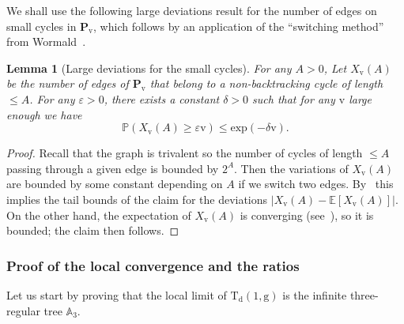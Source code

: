 \documentclass[11pt]{article}
\theoremstyle{plain}
\newtheorem{lemma}[theorem]{Lemma}
\theoremstyle{definition}
\theoremstyle{remark}
\renewcommand{\P}{\mathbb{P}}
\newcommand{\E}{\mathbb{E}}
\newcommand{\Triv}{\mathrm{T}}
\newcommand{\defect}{\mathrm{d}}
\newcommand{\gen}{\mathrm{g}}
\newcommand{\ver}{\mathrm{v}}
\begin{document}
We shall use the following large deviations result for the number of edges on small cycles in $\mathbf{P}_{\ver}$, which follows by an application of the ``switching method'' from Wormald~\cite[Th.\,2.19]{Wor99}.

\begin{lemma}[Large deviations for the small cycles]
\label{lem:grandes_dev_cycles_config}
For any $A>0$, Let $X_{ \ver}(A)$ be the number of edges of $\mathbf{P}_{\ver}$ that belong to a non-backtracking cycle of length $\leq A$. For any $ \varepsilon>0$, there exists a constant $ \delta >0$ such that for any $\ver$ large enough we have
\[
\P(X_{ \ver}(A) \geq \varepsilon \ver) \leq \mathrm{exp}(- \delta \ver).
\]
\end{lemma}

\begin{proof}
Recall that the graph is trivalent so the number of cycles of length $\leq A$ passing through a given edge is bounded by $2^A$. Then the variations of $ X_{ \ver}(A)$ are bounded by some constant depending on $A$ if we switch two edges. By~\cite[Th.\,2.19]{Wor99} this implies the tail bounds of the claim for the deviations $|X_{ \ver}(A) - \E[X_{ \ver}(A)]|$. On the other hand, the expectation of $X_{ \ver}(A)$ is converging (see~\cite[Eq.\,(8) in \S2.3]{Wor99}), so it is bounded; the claim then follows.
\end{proof}

\subsubsection{Proof of the local convergence and the ratios}

Let us start by proving that the local limit of $ \Triv_{\defect}(1, \gen)$ is the infinite three-regular tree $\mathbb{A}_3$.
\end{document}
